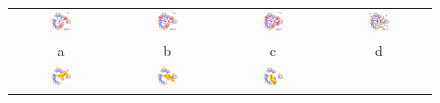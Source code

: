 \documentclass[usletter, 10pt, conference]{svjour3}      %
\begin{document}
\begin{figure}
\centering
{
\renewcommand{\tabcolsep}{1pt}
\begin{tabular}{cccc}
\includegraphics[width=0.24\textwidth]{fig/blockingb5} &
\includegraphics[width=0.24\textwidth]{fig/blockingb6} &
\includegraphics[width=0.24\textwidth]{fig/blockingb7} & 
\includegraphics[width=0.24\textwidth]{fig/blockingb9} \\
a & b & c & d \\
\includegraphics[width=0.24\textwidth]{fig/blockingb10a} &
\includegraphics[width=0.24\textwidth]{fig/blockingb10b} & 
\includegraphics[width=0.24\textwidth]{fig/blockingb10c} & 

\end{tabular}}
\end{figure}
\end{document}
